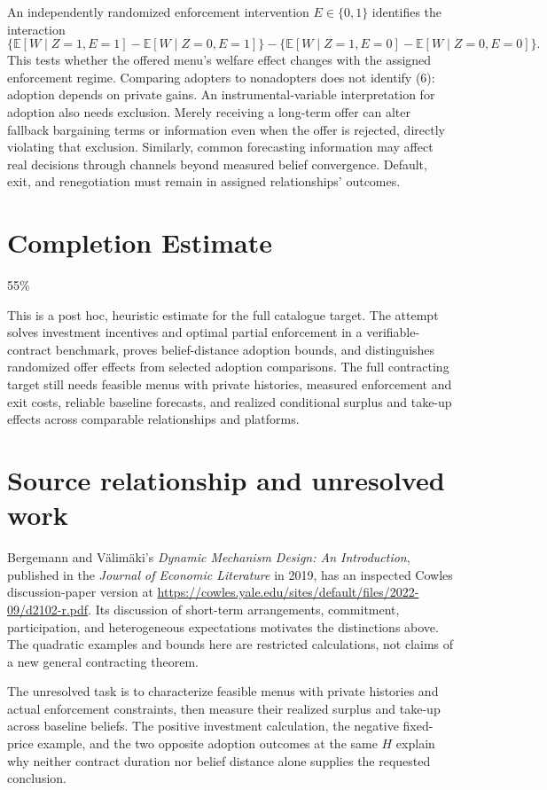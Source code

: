 \documentclass[11pt]{article}
\newcommand{\E}{\mathbb E}
\begin{document}
An independently randomized enforcement intervention $E\in\{0,1\}$ identifies the interaction
\[
 \{\E[W\mid Z=1,E=1]-\E[W\mid Z=0,E=1]\}
 -\{\E[W\mid Z=1,E=0]-\E[W\mid Z=0,E=0]\}.                 \tag{6}
\]
This tests whether the offered menu's welfare effect changes with the assigned enforcement regime. Comparing adopters to nonadopters does not identify (6): adoption depends on private gains. An instrumental-variable interpretation for adoption also needs exclusion. Merely receiving a long-term offer can alter fallback bargaining terms or information even when the offer is rejected, directly violating that exclusion. Similarly, common forecasting information may affect real decisions through channels beyond measured belief convergence. Default, exit, and renegotiation must remain in assigned relationships' outcomes.

\section{Completion Estimate}
55\%

This is a post hoc, heuristic estimate for the full catalogue target.
The attempt solves investment incentives and optimal partial enforcement in a verifiable-contract benchmark, proves belief-distance adoption bounds, and distinguishes randomized offer effects from selected adoption comparisons. The full contracting target still needs feasible menus with private histories, measured enforcement and exit costs, reliable baseline forecasts, and realized conditional surplus and take-up effects across comparable relationships and platforms.

\section*{Source relationship and unresolved work}
Bergemann and V\"alim\"aki's \emph{Dynamic Mechanism Design: An Introduction}, published in the \emph{Journal of Economic Literature} in 2019, has an inspected Cowles discussion-paper version at
\url{https://cowles.yale.edu/sites/default/files/2022-09/d2102-r.pdf}.
Its discussion of short-term arrangements, commitment, participation, and heterogeneous expectations motivates the distinctions above. The quadratic examples and bounds here are restricted calculations, not claims of a new general contracting theorem.

The unresolved task is to characterize feasible menus with private histories and actual enforcement constraints, then measure their realized surplus and take-up across baseline beliefs. The positive investment calculation, the negative fixed-price example, and the two opposite adoption outcomes at the same $H$ explain why neither contract duration nor belief distance alone supplies the requested conclusion.
\end{document}
